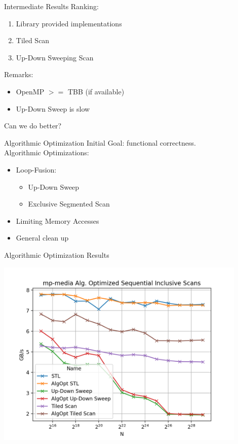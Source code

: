 \begin{frame}{Intermediate Results}
 Ranking:
 \begin{enumerate}
  \item Library provided implementations
  \item Tiled Scan
  \item Up-Down Sweeping Scan 
 \end{enumerate}
 Remarks:
 \begin{itemize}
  \item OpenMP $>=$ TBB (if available)
  \item Up-Down Sweep is slow
 \end{itemize}
 \vspace{10pt}
    \centering Can we do better?
\end{frame}

\begin{frame}{Algorithmic Optimization}
Initial Goal: functional correctness.\\
\vspace{20pt}
Algorithmic Optimizations:
\begin{itemize}
 \item Loop-Fusion:
 \begin{itemize}
  \item Up-Down Sweep
  \item Exclusive Segmented Scan
 \end{itemize}
 \item Limiting Memory Accesses
 \item General clean up
\end{itemize}
\end{frame} 

\begin{frame}{Algorithmic Optimization Results}
 
  \centering
  \vspace{-5pt}
  \includegraphics[width=0.90\textwidth]{"graphs/mp-media Alg. Optimized Sequential Inclusive Scans"}
 
\end{frame}

